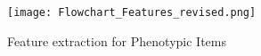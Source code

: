 \documentclass{sig-alternate-05-2015}
\begin{document}
%


\begin{figure} [t]
\centering
\texttt{[image: Flowchart\_Features\_revised.png]}
\caption{Feature extraction for Phenotypic Items}
\label{fig:feature-extract}
\end{figure}
\end{document}
